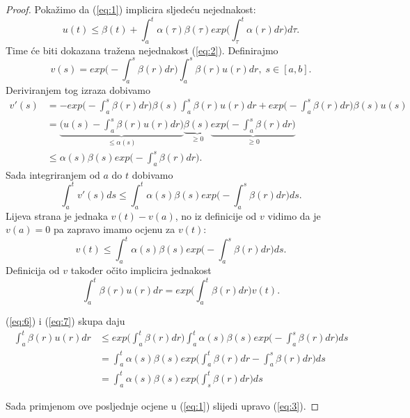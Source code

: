 \documentclass[a4paper,oneside,12pt]{memoir} %
\begin{document}
\begin{proof}
Pokažimo da (\ref{eq:1}) implicira sljedeću nejednakost:
\begin{equation} \label{eq:3}
u(t) \leq \beta(t) + \int_a^t \alpha(\tau) \beta(\tau) exp \Big( \int_{\tau}^t \alpha(r) dr \Big) d\tau.
\end{equation}
Time će biti dokazana tražena nejednakost (\ref{eq:2}). \newline
Definirajmo
\begin{equation}
v(s) = exp \Big( - \int_a^s \beta(r) dr \Big) \int_a^s \beta(r) u(r) dr, \; s \in [a, b].
\end{equation}
Deriviranjem tog izraza dobivamo
\begin{align*}
v'(s) &= - exp \Big( - \int_a^s \beta(r) dr \Big) \beta(s) \int_a^s \beta(r) u(r) dr + exp \Big( - \int_a^s \beta(r) dr \Big) \beta(s) u(s) \\
&= \underbrace{\Big( u(s) - \int_a^s \beta(r) u(r) dr \Big)}_{\leq \alpha(s)} \underbrace{\beta(s)}_{\geq 0} \underbrace{exp \Big( - \int_a^s \beta(r) dr \Big)}_{\geq 0} \\
&\leq \alpha(s) \beta(s) exp \Big( - \int_a^s \beta(r) dr \Big).
\end{align*}
Sada integriranjem od $a$ do $t$ dobivamo
\begin{equation}
\int_a^t v'(s) ds \leq \int_a^t \alpha(s) \beta(s) exp \Big( - \int_a^s \beta(r) dr \Big) ds.
\end{equation}
Lijeva strana je jednaka $v(t) - v(a)$, no iz definicije od $v$ vidimo da je $v(a) = 0$ pa zapravo imamo ocjenu za $v(t)$:
\begin{equation} \label{eq:6}
v(t) \leq \int_a^t \alpha(s) \beta(s) exp \Big( - \int_a^s \beta(r) dr \Big) ds.
\end{equation}
Definicija od $v$ također očito implicira jednakost
\begin{equation} \label{eq:7}
\int_a^t \beta(r) u(r) dr = exp \Big( \int_a^t \beta(r) dr \Big) v(t).
\end{equation}

(\ref{eq:6}) i (\ref{eq:7}) skupa daju
\begin{align*}
\int_a^t \beta(r) u(r) dr &\leq exp \Big( \int_a^t \beta(r) dr \Big) \int_a^t \alpha(s) \beta(s) exp \Big( - \int_a^s \beta(r) dr \Big) ds \\
&= \int_a^t \alpha(s) \beta(s) exp \Big( \int_a^t \beta(r) dr - \int_a^s \beta(r) dr \Big) ds \\
&= \int_a^t \alpha(s) \beta(s) exp \Big( \int_s^t \beta(r) dr \Big) ds 
\end{align*}

Sada primjenom ove posljednje ocjene u (\ref{eq:1}) slijedi upravo (\ref{eq:3}).
\end{proof}
\end{document}
